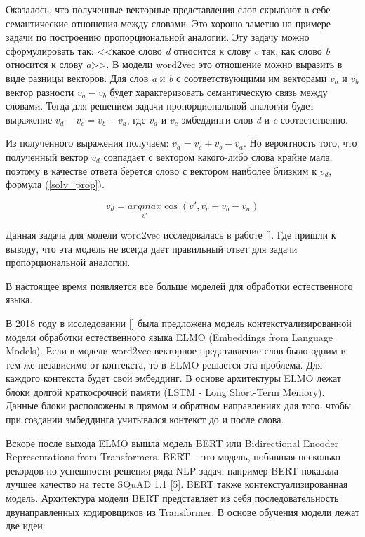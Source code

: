 \documentclass[a4paper,14pt]{article}
\begin{document}
Оказалось, что полученные векторные представления слов скрывают в себе семантические отношения между словами.
Это хорошо заметно на примере задачи по построению пропорциональной аналогии.
Эту задачу можно сформулировать так: <<какое слово \textit{d} относится к слову \textit{c} так, 
как слово \textit{b} относится к слову \textit{a}>>.
В модели word2vec это отношение можно выразить в виде разницы векторов.
Для слов \textit{a} и \textit{b} с соответствующими им векторами $v_a$ и $v_b$ вектор разности $v_a - v_b$ будет характеризовать семантическую связь между словами.
Тогда для решением задачи пропорциональной аналогии будет выражение $v_d - v_c = v_b - v_a$, где $v_d$ и $v_c$ эмбеддинги слов \textit{d} и \textit{c} соответственно.

Из полученного выражения получаем: $v_d = v_c + v_b - v_a$.
Но вероятность того, что полученный вектор $v_d$ совпадает с вектором какого-либо слова крайне мала, поэтому в качестве ответа берется слово с вектором наиболее близким к $v_d$, формула (\ref{solv_prop}).

\begin{equation}
	v_d = \underset{v'}{argmax} \cos (v', v_c + v_b - v_a)
	\label{solv_prop}
\end{equation}

Данная задача для модели word2vec исследовалась в работе []. Где пришли к выводу, что эта модель не всегда дает правильный ответ для задачи пропорциональной аналогии.

В настоящее время появляется все больше моделей для обработки естественного языка.

В 2018 году в исследовании [] была предложена модель контекстуализированной модели обработки естественного языка ELMO (Embeddings from Language Models).
Если в модели word2vec векторное представление слов было одним и тем же независимо от контекста, то в ELMO решается эта проблема.
Для каждого контекста будет свой эмбеддинг.
В основе архитектуры ELMO лежат блоки долгой краткосрочной памяти (LSTM - Long Short-Term Memory).
Данные блоки расположены в прямом и обратном направлениях для того, чтобы при создании эмбеддинга учитывался контекст до и после слова.

Вскоре после выхода ELMO вышла модель BERT или Bidirectional Encoder Representations from Transformers.
BERT – это модель, побившая несколько рекордов по успешности решения ряда NLP-задач, например BERT показала лучшее качество на тесте SQuAD 1.1 [5].
BERT также контекстуализированная модель.
Архитектура модели BERT представляет из себя последовательность двунаправленных кодировщиков из Transformer.
В основе обучения модели лежат две идеи:
\end{document}
